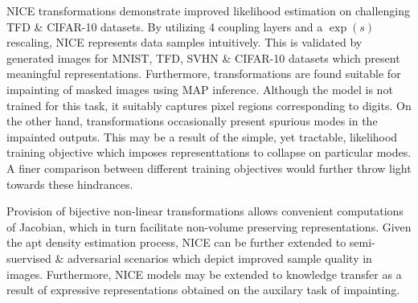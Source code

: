 \documentclass[11pt,letterpaper]{article}
\begin{document}
NICE transformations demonstrate improved likelihood estimation on challenging TFD \& CIFAR-10 datasets. By utilizing 4 coupling layers and a $\exp(s)$ rescaling, NICE represents data samples intuitively. This is validated by generated images for MNIST, TFD, SVHN \& CIFAR-10 datasets which present meaningful representations. Furthermore, transformations are found suitable for impainting of masked images using MAP inference. Although the model is not trained for this task, it suitably captures pixel regions corresponding to digits. On the other hand, transformations occasionally present spurious modes in the impainted outputs. This may be a result of the simple, yet tractable, likelihood training objective which imposes representtations to collapse on particular modes. A finer comparison between different training objectives would further throw light towards these hindrances. 

Provision of bijective non-linear transformations allows convenient computations of Jacobian, which in turn facilitate non-volume preserving representations. Given the apt density estimation process, NICE can be further extended to semi-suervised \& adversarial scenarios which depict improved sample quality in images. Furthermore, NICE models may be extended to knowledge transfer as a result of expressive representations obtained on the auxilary task of impainting. 
\end{document}
